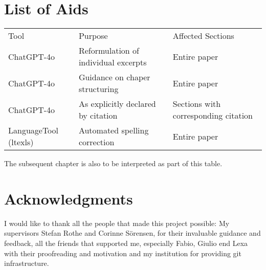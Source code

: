 \chapter*{List of Aids}
\begin{table}[H]
    \begin{tabular}{lll}
        Tool & Purpose & Affected Sections \\
        ChatGPT-4o & Reformulation of individual excerpts & Entire paper \\
        ChatGPT-4o & Guidance on chaper structuring & Entire paper \\
        ChatGPT-4o & As explicitly declared by citation & Sections with corresponding citation \\
        LanguageTool (ltexls) & Automated spelling correction & Entire paper \\
    \end{tabular}

\end{table}
The subsequent chapter is also to be interpreted as part of this table.

\begingroup
\renewcommand{\cleardoublepage}{}
\renewcommand{\clearpage}{}
\chapter*{Acknowledgments}\label{chap:ack}
\endgroup
I would like to thank all the people that made this project possible: My supervisors Stefan Rothe and Corinne Sörensen, for their invaluable guidance and feedback, all the friends that supported me, especially Fabio, Giulio end Lexa with their proofreading and motivation and my institution for providing git infrastructure.
